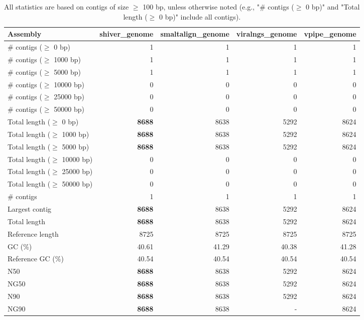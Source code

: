 \documentclass[12pt,a4paper]{article}
\begin{document}
\begin{table}[ht]
\begin{center}
\caption{All statistics are based on contigs of size $\geq$ 100 bp, unless otherwise noted (e.g., "\# contigs ($\geq$ 0 bp)" and "Total length ($\geq$ 0 bp)" include all contigs).}
\begin{tabular}{|l*{4}{|r}|}
\hline
Assembly & shiver\_genome & smaltalign\_genome & viralngs\_genome & vpipe\_genome \\ \hline
\# contigs ($\geq$ 0 bp) & 1 & 1 & 1 & 1 \\ \hline
\# contigs ($\geq$ 1000 bp) & 1 & 1 & 1 & 1 \\ \hline
\# contigs ($\geq$ 5000 bp) & 1 & 1 & 1 & 1 \\ \hline
\# contigs ($\geq$ 10000 bp) & 0 & 0 & 0 & 0 \\ \hline
\# contigs ($\geq$ 25000 bp) & 0 & 0 & 0 & 0 \\ \hline
\# contigs ($\geq$ 50000 bp) & 0 & 0 & 0 & 0 \\ \hline
Total length ($\geq$ 0 bp) & {\bf 8688} & 8638 & 5292 & 8624 \\ \hline
Total length ($\geq$ 1000 bp) & {\bf 8688} & 8638 & 5292 & 8624 \\ \hline
Total length ($\geq$ 5000 bp) & {\bf 8688} & 8638 & 5292 & 8624 \\ \hline
Total length ($\geq$ 10000 bp) & 0 & 0 & 0 & 0 \\ \hline
Total length ($\geq$ 25000 bp) & 0 & 0 & 0 & 0 \\ \hline
Total length ($\geq$ 50000 bp) & 0 & 0 & 0 & 0 \\ \hline
\# contigs & 1 & 1 & 1 & 1 \\ \hline
Largest contig & {\bf 8688} & 8638 & 5292 & 8624 \\ \hline
Total length & {\bf 8688} & 8638 & 5292 & 8624 \\ \hline
Reference length & 8725 & 8725 & 8725 & 8725 \\ \hline
GC (\%) & 40.61 & 41.29 & 40.38 & 41.28 \\ \hline
Reference GC (\%) & 40.54 & 40.54 & 40.54 & 40.54 \\ \hline
N50 & {\bf 8688} & 8638 & 5292 & 8624 \\ \hline
NG50 & {\bf 8688} & 8638 & 5292 & 8624 \\ \hline
N90 & {\bf 8688} & 8638 & 5292 & 8624 \\ \hline
NG90 & {\bf 8688} & 8638 & - & 8624 \\ \hline

\end{tabular}
\end{center}
\end{table}
\end{document}
